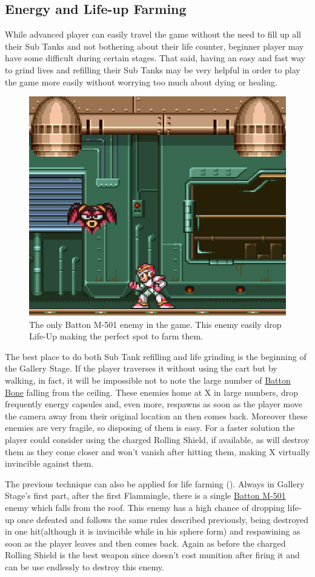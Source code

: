 \subsection{Energy and Life-up Farming}
While advanced player can easily travel the game without the need to fill up all their Sub Tanks and not bothering about their life counter, beginner player may have some difficult during certain stages. That said, having an easy and fast way to grind lives and refilling their Sub Tanks may be very helpful in order to play the game more easily without worrying too much about dying or healing.
\begin{figure}[htp]
	\centering
	\includegraphics[width=0.5\linewidth]{figures/X1/Miscs/Farming_spot.jpg}
	\caption{The only Batton M-501 enemy in the game. This enemy easily drop Life-Up making the perfect spot to farm them.}
\end{figure}
The best place to do both Sub Tank refilling and life grinding is the beginning of the Gallery Stage. If the player traverses it without using the cart but by walking, in fact, it will be impossible not to note the large number of \hyperlink{enem:Batton_Bone}{Batton Bone}  falling from the ceiling. These enemies home at X in large numbers, drop frequently energy capsules and, even more, respawns as soon as the player move the camera away from their original location an then comes back. Moreover these enemies are very fragile, so disposing of them is easy. For a faster solution the player could consider using the charged Rolling Shield, if available, as will destroy them as they come closer and won't vanish after hitting them, making X virtually invincible against them.

The previous technique can also be applied for life farming (). Always in Gallery Stage's first part, after the first Flammingle, there is a single \hyperlink{enem:Batton_M-501}{Batton M-501}  enemy which falls from the roof. This enemy has a high chance of dropping life-up once defeated and follows the same rules described previously, being destroyed in one hit(although it is invincible while in his sphere form) and respawining as soon as the player leaves and then comes back. Again as before the charged Rolling Shield is the best weapon since doesn't cost munition after firing it and can be use endlessly to destroy this enemy.

